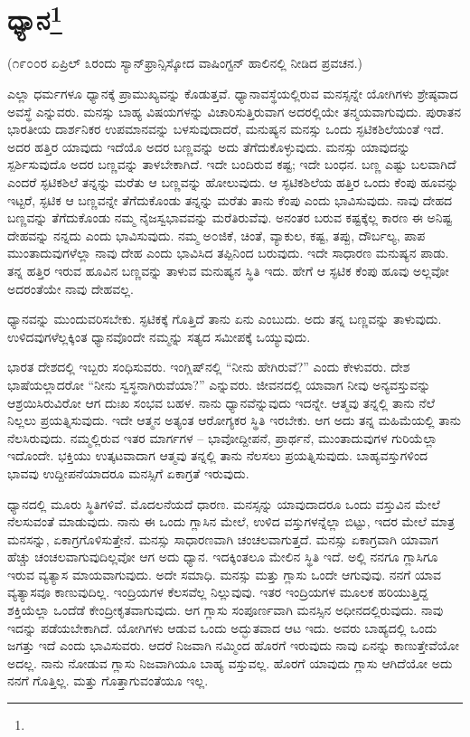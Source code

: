 
\chapter[ಧ್ಯಾನ]{ಧ್ಯಾನ\protect\footnote{}}

\begin{center}
(೧೯೦೦ರ ಏಪ್ರಿಲ್ ೩ರಂದು ಸ್ಯಾನ್‌ಫ್ರಾನ್ಸಿಸ್ಕೋದ ವಾಷಿಂಗ್ಟನ್ ಹಾಲಿನಲ್ಲಿ ನೀಡಿದ ಪ್ರವಚನ.)
\end{center}

ಎಲ್ಲಾ ಧರ್ಮಗಳೂ ಧ್ಯಾನಕ್ಕೆ ಪ್ರಾಮುಖ್ಯವನ್ನು ಕೊಡುತ್ತವೆ. ಧ್ಯಾನಾವಸ್ಥೆಯಲ್ಲಿರುವ ಮನಸ್ಸನ್ನೇ ಯೋಗಿಗಳು ಶ್ರೇಷ್ಠವಾದ ಅವಸ್ಥೆ ಎನ್ನುವರು. ಮನಸ್ಸು ಬಾಹ್ಯ ವಿಷಯಗಳನ್ನು ವಿಚಾರಿಸುತ್ತಿರುವಾಗ ಅದರಲ್ಲಿಯೇ ತನ್ಮಯವಾಗುವುದು. ಪುರಾತನ ಭಾರತೀಯ ದಾರ್ಶನಿಕರ ಉಪಮಾನವನ್ನು ಬಳಸುವುದಾದರೆ, ಮನುಷ್ಯನ ಮನಸ್ಸು ಒಂದು ಸ್ಫಟಿಕಶಿಲೆಯಂತೆ ಇದೆ. ಅದರ ಹತ್ತಿರ ಯಾವುದು ಇದೆಯೊ ಅದರ ಬಣ್ಣವನ್ನು ಅದು ತೆಗೆದುಕೊಳ್ಳುವುದು. ಮನಸ್ಸು ಯಾವುದನ್ನು ಸ್ಪರ್ಶಿಸುವುದೊ ಅದರ ಬಣ್ಣವನ್ನು ತಾಳಬೇಕಾಗಿದೆ. ಇದೇ ಬಂದಿರುವ ಕಷ್ಟ; ಇದೇ ಬಂಧನ. ಬಣ್ಣ ಎಷ್ಟು ಬಲವಾಗಿದೆ ಎಂದರೆ ಸ್ಫಟಿಕಶಿಲೆ ತನ್ನನ್ನು ಮರೆತು ಆ ಬಣ್ಣವನ್ನು ಹೋಲುವುದು. ಆ ಸ್ಫಟಿಕಶಿಲೆಯ ಹತ್ತಿರ ಒಂದು ಕೆಂಪು ಹೂವನ್ನು ಇಟ್ಟರೆ, ಸ್ಫಟಿಕ ಆ ಬಣ್ಣವನ್ನೇ ತೆಗೆದುಕೊಂಡು ತನ್ನನ್ನು ಮರೆತು ತಾನು ಕೆಂಪು ಎಂದು ಭಾವಿಸುವುದು. ನಾವು ದೇಹದ ಬಣ್ಣವನ್ನು ತೆಗೆದುಕೊಂಡು ನಮ್ಮ ನೈಜಸ್ವಭಾವವನ್ನು ಮರೆತಿರುವೆವು. ಅನಂತರ ಬರುವ ಕಷ್ಟಕ್ಕೆಲ್ಲ ಕಾರಣ ಈ ಅನಿಷ್ಟ ದೇಹವನ್ನು ನನ್ನದು ಎಂದು ಭಾವಿಸುವುದು. ನಮ್ಮ ಅ೦ಜಿಕೆ, ಚಿಂತೆ, ವ್ಯಾಕುಲ, ಕಷ್ಟ, ತಪ್ಪು, ದೌರ್ಬಲ್ಯ, ಪಾಪ ಮುಂತಾದುವುಗಳೆಲ್ಲಾ ನಾವು ದೇಹ ಎಂದು ಭಾವಿಸಿದ ತಪ್ಪಿನಿಂದ ಬರುವುದು. ಇದೇ ಸಾಧಾರಣ ಮನುಷ್ಯನ ಪಾಡು. ತನ್ನ ಹತ್ತಿರ ಇರುವ ಹೂವಿನ ಬಣ್ಣವನ್ನು ತಾಳುವ ಮನುಷ್ಯನ ಸ್ಥಿತಿ ಇದು. ಹೇಗೆ ಆ ಸ್ಫಟಿಕ ಕೆಂಪು ಹೂವು ಅಲ್ಲವೋ ಅದರಂತೆಯೇ ನಾವು ದೇಹವಲ್ಲ.

ಧ್ಯಾನವನ್ನು ಮುಂದುವರಿಸಬೇಕು. ಸ್ಫಟಿಕಕ್ಕೆ ಗೊತ್ತಿದೆ ತಾನು ಏನು ಎಂಬುದು. ಅದು ತನ್ನ ಬಣ್ಣವನ್ನು ತಾಳುವುದು. ಉಳಿದವುಗಳೆಲ್ಲಕ್ಕಿಂತ ಧ್ಯಾನವೊಂದೇ ನಮ್ಮನ್ನು ಸತ್ಯದ ಸಮೀಪಕ್ಕೆ ಒಯ್ಯುವುದು.

ಭಾರತ ದೇಶದಲ್ಲಿ ಇಬ್ಬರು ಸಂಧಿಸುವರು. ಇಂಗ್ಲಿಷ್‌ನಲ್ಲಿ “ನೀನು ಹೇಗಿರುವೆ?” ಎಂದು ಕೇಳುವರು. ದೇಶ ಭಾಷೆಯಲ್ಲಾದರೋ “ನೀನು ಸ್ವಸ್ಥನಾಗಿರುವೆಯಾ?” ಎನ್ನುವರು. ಜೀವನದಲ್ಲಿ ಯಾವಾಗ ನೀವು ಅನ್ಯವಸ್ತುವನ್ನು ಆಶ್ರಯಿಸಿರುವಿರೋ ಆಗ ದುಃಖ ಸಂಭವ ಬಹಳ. ನಾನು ಧ್ಯಾನವೆನ್ನುವುದು ಇದನ್ನೇ. ಆತ್ಮವು ತನ್ನಲ್ಲಿ ತಾನು ನೆಲೆ ನಿಲ್ಲಲು ಪ್ರಯತ್ನಿಸುವುದು. ಇದೇ ಆತ್ಮನ ಅತ್ಯಂತ ಆರೋಗ್ಯಕರ ಸ್ಥಿತಿ ಇರಬೇಕು. ಆಗ ಅದು ತನ್ನ ಮಹಿಮೆಯಲ್ಲಿ ತಾನು ನೆಲಸಿರುವುದು. ನಮ್ಮಲ್ಲಿರುವ ಇತರ ಮಾರ್ಗಗಳ – ಭಾವೋದ್ದೀಪನೆ, ಪ್ರಾರ್ಥನೆ, ಮುಂತಾದುವುಗಳ ಗುರಿಯೆಲ್ಲಾ ಇದೊಂದೇ. ಭಕ್ತಿಯು ಉತ್ಕಟವಾದಾಗ ಆತ್ಮವು ತನ್ನಲ್ಲಿ ತಾನು ನೆಲಸಲು ಪ್ರಯತ್ನಿಸುವುದು. ಬಾಹ್ಯವಸ್ತುಗಳಿಂದ ಭಾವವು ಉದ್ದೀಪನೆಯಾದರೂ ಮನಸ್ಸಿಗೆ ಏಕಾಗ್ರತೆ ಇರುವುದು.

ಧ್ಯಾನದಲ್ಲಿ ಮೂರು ಸ್ಥಿತಿಗಳಿವೆ. ಮೊದಲನೆಯದೆ ಧಾರಣ. ಮನಸ್ಸನ್ನು ಯಾವುದಾದರೂ ಒಂದು ವಸ್ತುವಿನ ಮೇಲೆ ನೆಲಸುವಂತೆ ಮಾಡುವುದು. ನಾನು ಈ ಒಂದು ಗ್ಲಾಸಿನ ಮೇಲೆ, ಉಳಿದ ವಸ್ತುಗಳನ್ನೆಲ್ಲಾ ಬಿಟ್ಟು, ಇದರ ಮೇಲೆ ಮಾತ್ರ ಮನಸನ್ನು, ಏಕಾಗ್ರಗೊಳಿಸುತ್ತೇನೆ. ಮನಸ್ಸು ಸಾಧಾರಣವಾಗಿ ಚಂಚಲವಾಗುತ್ತದೆ. ಮನಸ್ಸು ಏಕಾಗ್ರವಾಗಿ ಯಾವಾಗ ಹೆಚ್ಚು ಚಂಚಲವಾಗುವುದಿಲ್ಲವೋ ಆಗ ಅದು ಧ್ಯಾನ. ಇದಕ್ಕಿಂತಲೂ ಮೇಲಿನ ಸ್ಥಿತಿ ಇದೆ. ಅಲ್ಲಿ ನನಗೂ ಗ್ಲಾಸಿಗೂ ಇರುವ ವ್ಯತ್ಯಾಸ ಮಾಯವಾಗುವುದು. ಅದೇ ಸಮಾಧಿ. ಮನಸ್ಸು ಮತ್ತು ಗ್ಲಾಸು ಒಂದೇ ಆಗುವುವು. ನನಗೆ ಯಾವ ವ್ಯತ್ಯಾಸವೂ ಕಾಣುವುದಿಲ್ಲ. ಇಂದ್ರಿಯಗಳ ಕೆಲಸವೆಲ್ಲ ನಿಲ್ಲುವುವು. ಇತರ ಇಂದ್ರಿಯಗಳ ಮೂಲಕ ಹರಿಯುತ್ತಿದ್ದ ಶಕ್ತಿಯೆಲ್ಲಾ ಒಂದೆಡೆ ಕೇಂದ್ರೀಕೃತವಾಗುವುದು. ಆಗ ಗ್ಲಾಸು ಸಂಪೂರ್ಣವಾಗಿ ಮನಸ್ಸಿನ ಅಧೀನದಲ್ಲಿರುವುದು. ನಾವು ಇದನ್ನು ಪಡೆಯಬೇಕಾಗಿದೆ. ಯೋಗಿಗಳು ಆಡುವ ಒಂದು ಅದ್ಭುತವಾದ ಆಟ ಇದು. ಅವರು ಬಾಹ್ಯದಲ್ಲಿ ಒಂದು ಜಗತ್ತು ಇದೆ ಎಂದು ಭಾವಿಸುವರು. ಆದರೆ ನಿಜವಾಗಿ ನಮ್ಮಿಂದ ಹೊರಗೆ ಇರುವುದು ನಾವು ಏನನ್ನು ಕಾಣುತ್ತೇವೆಯೋ ಅದಲ್ಲ. ನಾನು ನೋಡುವ ಗ್ಲಾಸು ನಿಜವಾಗಿಯೂ ಬಾಹ್ಯ ವಸ್ತುವಲ್ಲ. ಹೊರಗೆ ಯಾವುದು ಗ್ಲಾಸು ಆಗಿದೆಯೋ ಅದು ನನಗೆ ಗೊತ್ತಿಲ್ಲ. ಮತ್ತು ಗೊತ್ತಾಗುವಂತೆಯೂ ಇಲ್ಲ.


